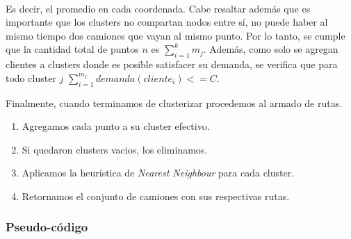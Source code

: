 \paragraph{} 
Es decir, el promedio en cada coordenada. Cabe resaltar además que es importante que los clusters no compartan nodos entre sí, no puede haber al mismo tiempo dos camiones que vayan al mismo punto. Por lo tanto, se cumple que la cantidad total de puntos $n$ es $\sum_{i=1}^{k} m_{j}$. Además, como solo se agregan clientes a clusters donde es posible satisfacer su demanda, se verifica que para todo cluster $j$ $\sum_{i=1}^{m_{j}} demanda(cliente_{i}) <= C$.
\\
\par Finalmente, cuando terminamos de clusterizar procedemos al armado de rutas.
\begin{enumerate}
	\item Agregamos cada punto a su cluster efectivo.
	\item Si quedaron clusters vacios, los eliminamos.
	\item Aplicamos la heurística de \textit{Nearest Neighbour} para cada cluster.
	\item Retornamos el conjunto de camiones con sus respectivas rutas.
\end{enumerate}

\subsubsection{Pseudo-código}

